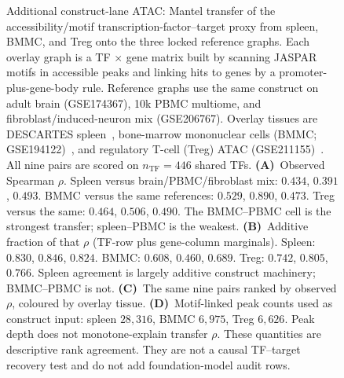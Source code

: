 \documentclass[fleqn,10pt,lineno]{wlpeerj}
\newcommand{\fitfig}[1]{\resizebox{\ifdim\width>\linewidth\linewidth\else\width\fi}{!}{#1}}
\begin{document}
\begin{figure}[!htbp]
\centering
\fitfig{}
\caption{Additional construct-lane ATAC: Mantel transfer of the accessibility/motif transcription-factor--target proxy from spleen, BMMC, and Treg onto the three locked reference graphs.
Each overlay graph is a TF $\times$ gene matrix built by scanning JASPAR motifs in accessible peaks
and linking hits to genes by a promoter-plus-gene-body rule. Reference graphs use the same construct
on adult brain (GSE174367), 10k PBMC multiome, and fibroblast/induced-neuron mix (GSE206767). Overlay
tissues are DESCARTES spleen~\citep{domcke2020descartes}, bone-marrow mononuclear cells
(BMMC; GSE194122)~\citep{luecken2021sandbox}, and regulatory
T-cell (Treg) ATAC (GSE211155)~\citep{itahashi2022batf}. All nine pairs are scored on $n_{\mathrm{TF}}=446$ shared TFs.
\textbf{(A)}~Observed Spearman $\rho$. Spleen versus brain/PBMC/fibroblast mix: $0.434$, $0.391$,
$0.493$. BMMC versus the same references: $0.529$, $0.890$, $0.473$. Treg versus the same: $0.464$,
$0.506$, $0.490$. The BMMC--PBMC cell is the strongest transfer; spleen--PBMC is the weakest.
\textbf{(B)}~Additive fraction of that $\rho$ (TF-row plus gene-column marginals). Spleen: $0.830$,
$0.846$, $0.824$. BMMC: $0.608$, $0.460$, $0.689$. Treg: $0.742$, $0.805$, $0.766$. Spleen agreement
is largely additive construct machinery; BMMC--PBMC is not.
\textbf{(C)}~The same nine pairs ranked by observed $\rho$, coloured by overlay tissue.
\textbf{(D)}~Motif-linked peak counts used as construct input: spleen $28{,}316$, BMMC $6{,}975$,
Treg $6{,}626$. Peak depth does not monotone-explain transfer $\rho$.
These quantities are descriptive rank agreement. They are not a causal TF--target recovery test and
do not add foundation-model audit rows.}
\label{fig:app-mantel}
\end{figure}
\end{document}
